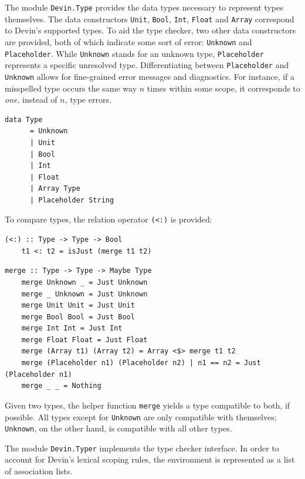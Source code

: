 \documentclass[UdineBachThesis,american,11pt]{PhdThesis}
\begin{document}
  The module \mbox{\texttt{Devin.Type}} provides the data types necessary to
  represent types themselves. The data constructors \mbox{\texttt{Unit}},
  \mbox{\texttt{Bool}}, \mbox{\texttt{Int}}, \mbox{\texttt{Float}} and
  \mbox{\texttt{Array}} correspond to Devin's supported types. To aid the type
  checker, two other data constructors are provided, both of which indicate some
  sort of error: \mbox{\texttt{Unknown}} and \mbox{\texttt{Placeholder}}. While
  \mbox{\texttt{Unknown}} stands for an unknown type,
  \mbox{\texttt{Placeholder}} represents a specific unresolved type.
  Differentiating between \mbox{\texttt{Placeholder}} and
  \mbox{\texttt{Unknown}} allows for fine-grained error messages and
  diagnostics. For instance, if a misspelled type occurs the same way $n$ times
  within some scope, it corresponds to \emph{one}, instead of $n$, type errors.

  \begin{Verbatim}[gobble=4,fontsize=\small]
    data Type
      = Unknown
      | Unit
      | Bool
      | Int
      | Float
      | Array Type
      | Placeholder String
  \end{Verbatim}

  To compare types, the relation operator \mbox{\texttt{(<:)}} is provided:

  \begin{Verbatim}[gobble=4,fontsize=\small]
    (<:) :: Type -> Type -> Bool
    t1 <: t2 = isJust (merge t1 t2)
  \end{Verbatim}

  \pagebreak

  \begin{Verbatim}[gobble=4,fontsize=\small]
    merge :: Type -> Type -> Maybe Type
    merge Unknown _ = Just Unknown
    merge _ Unknown = Just Unknown
    merge Unit Unit = Just Unit
    merge Bool Bool = Just Bool
    merge Int Int = Just Int
    merge Float Float = Just Float
    merge (Array t1) (Array t2) = Array <$> merge t1 t2
    merge (Placeholder n1) (Placeholder n2) | n1 == n2 = Just (Placeholder n1)
    merge _ _ = Nothing
  \end{Verbatim}

  Given two types, the helper function \mbox{\texttt{merge}} yields a type
  compatible to both, if possible. All types except for \mbox{\texttt{Unknown}}
  are only compatible with themselves; \mbox{\texttt{Unknown}}, on the other
  hand, is compatible with all other types.

  The module \mbox{\texttt{Devin.Typer}} implements the type checker interface.
  In order to account for Devin's lexical scoping rules, the environment is
  represented as a list of association lists.
\end{document}
